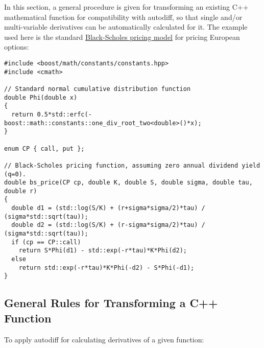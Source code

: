 \documentclass{article}
\begin{document}
In this section, a general procedure is given for transforming an existing C++
mathematical function for compatibility with autodiff, so that single and/or multi-variable
derivatives can be automatically calculated for it. The example used here is the standard
\href{https://en.wikipedia.org/wiki/Greeks_(finance)#Formulas_for_European_option_Greeks}{Black-Scholes pricing
model} for pricing European options:

\begingroup
\fontsize{10pt}{10pt}\selectfont
\begin{verbatim}
#include <boost/math/constants/constants.hpp>
#include <cmath>

// Standard normal cumulative distribution function
double Phi(double x)
{
  return 0.5*std::erfc(-boost::math::constants::one_div_root_two<double>()*x);
}

enum CP { call, put };

// Black-Scholes pricing function, assuming zero annual dividend yield (q=0).
double bs_price(CP cp, double K, double S, double sigma, double tau, double r)
{
  double d1 = (std::log(S/K) + (r+sigma*sigma/2)*tau) / (sigma*std::sqrt(tau));
  double d2 = (std::log(S/K) + (r-sigma*sigma/2)*tau) / (sigma*std::sqrt(tau));
  if (cp == CP::call)
    return S*Phi(d1) - std::exp(-r*tau)*K*Phi(d2);
  else
    return std::exp(-r*tau)*K*Phi(-d2) - S*Phi(-d1);
}
\end{verbatim}
\endgroup

\subsection{General Rules for Transforming a C++ Function}
To apply autodiff for calculating derivatives of a given function:
\end{document}
